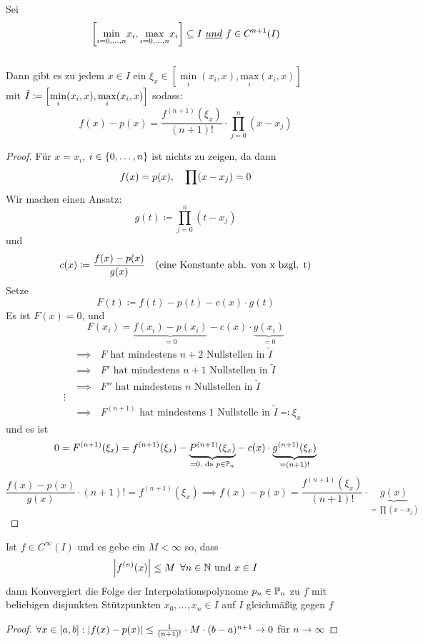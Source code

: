 \documentclass[../Skript.tex]{subfiles}
\begin{document}
\begin{theorem}
    Sei \[
    \left[\underset{i=0,\dots,n}{\min}x_i,\underset{i=0,\dots,n}{\text{max}}x_i\right] \subseteq I \ \emph{und}\ f\in 
    C^{n+1}(I)
    \]\\
    Dann gibt es zu jedem $x\in I $ ein $ \xi_x\in \left[\underset{i}{\min}(x_i,x),\underset{i}{\text{max}}(x_i,x)\right] $
   \\ mit $\Tilde{I}\coloneqq \left[\underset{i}{\min}(x_i,x),\underset{i}{\text{max}}(x_i,x)\right] $ sodass:\\
    \[
f(x)-p(x)=\frac{f^{(n+1)}(\xi_x)}{(n+1)!}\cdot\prod^n_{j=0}(x-x_j)
    \]
\end{theorem}
\begin{proof}
    Für $x=x_i$, $i\in \left\{ 0,\dots,n \right\}$ ist nichts zu zeigen, da dann \[
        f(x) = p(x), \hspace{1em} \prod(x-x_j) = 0\]
    Wir machen einen Ansatz:\[
        g(t)\coloneqq \prod_{j=0}^n(t-x_j)\]
    und \[
        c(x) \coloneqq \frac{f(x) - p(x)}{g(x)}\hspace{1em}\text{(eine Konstante abh. von x bzgl. t)}\]
    Setze \[
        F(t) \coloneqq f(t) - p(t) - c(x) \cdot g(t)\]
    Es ist $F(x) = 0$, und \[
        F(x_i) = \underset{=0}{\underbrace{f(x_i) - p(x_i)}} - c(x) \cdot 
        \underset{=0}{\underbrace{g(x_i)}}\]
    \begin{align*}
        &\implies \text{ $F$ hat mindestens $n+2$ Nullstellen in $\tilde{I}$}\\
        &\implies \text{ $F'$ hat mindestens $n+1$ Nullstellen in $\tilde{I}$}\\
        &\implies \text{ $F''$ hat mindestens $n$ Nullstellen in $\tilde{I}$}\\
        \vdots\\
    &\implies \text{ $F^{(n+1)}$ hat mindestens $1$ Nullstelle in $\tilde{I}\eqqcolon \xi_x$ }
    \end{align*}
    und es ist \[
        0 = F^{(n+1)}(\xi_x) = f^{(n+1)}(\xi_x) - \underset{=0, \text{ da } p\in\mathbb{P}_n}{\underbrace{P^{(n+1)}(\xi_x)}} - 
        c(x) \cdot \underset{=(n+1)!}{\underbrace{g^{(n+1)}(\xi_x)}}\]
    \[
        \frac{f(x) - p(x)}{g(x)} \cdot (n+1)! = f^{(n+1)}(\xi_x) \implies f(x)-p(x) = \frac{f^{(n+1)}(\xi_x)}{(n+1)!}\cdot 
        \underset{=\prod(x-x_j)}{\underbrace{g(x)}}\]
\end{proof}



\begin{corollary}
    Ist $f \in C^\infty(I)$ und es gebe ein $M<\infty$ so, dass \[
    \left\vert f^{(n)}(x) \right\vert \leq M\hspace{.5em} \forall n \in \mathbb{N} \text{ und }x\in I 
    \]
    dann Konvergiert die Folge der Interpolationspolynome $p_n\in\mathbb{P}_n$ zu $f$ mit beliebigen disjunkten Stützpunkten
    $x_0,\dots,x_n \in I$ auf $I$ gleichmäßig gegen $f$
\end{corollary}
\begin{proof}
    $\forall x\in [a,b]: \left\vert f(x)-p(x) \right\vert \leq \frac{1}{(n+1)!}\cdot M \cdot (b-a)^{n+1}\to 0$ für $n\to \infty$
\end{proof}
\end{document}

